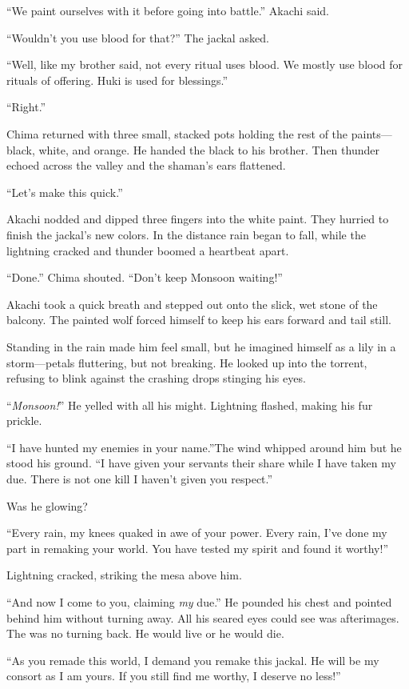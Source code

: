 ``We paint ourselves with it before going into battle.'' Akachi said.

``Wouldn't you use blood for that?'' The jackal asked.

``Well, like my brother said, not every ritual uses blood. We mostly use blood for rituals of offering. Huki is used for blessings.''

``Right.''

Chima returned with three small, stacked pots holding the rest of the paints---black, white, and orange. He handed the black to his brother. Then thunder echoed across the valley and the shaman's ears flattened.

``Let's make this quick.''

Akachi nodded and dipped three fingers into the white paint. They hurried to finish the jackal's new colors. In the distance rain began to fall, while the lightning cracked and thunder boomed a heartbeat apart.

``Done.'' Chima shouted. ``Don't keep Monsoon waiting!''

Akachi took a quick breath and stepped out onto the slick, wet stone of the balcony. The painted wolf forced himself to keep his ears forward and tail still.

Standing in the rain made him feel small, but he imagined himself as a lily in a storm---petals fluttering, but not breaking. He looked up into the torrent, refusing to blink against the crashing drops stinging his eyes.

``\emph{Monsoon!}'' He yelled with all his might. Lightning flashed, making his fur prickle.

``I have hunted my enemies in your name.''The wind whipped around him but he stood his ground. ``I have given your servants their share while I have taken my due. There is not one kill I haven't given you respect.''

Was he glowing?

``Every rain, my knees quaked in awe of your power. Every rain, I've done my part in remaking your world. You have tested my spirit and found it worthy!''

Lightning cracked, striking the mesa above him.

``And now I come to you, claiming \emph{my} due.'' He pounded his chest and pointed behind him without turning away. All his seared eyes could see was afterimages. The was no turning back. He would live or he would die.

``As you remade this world, I demand you remake this jackal. He will be my consort as I am yours. If you still find me worthy, I deserve no less!''

